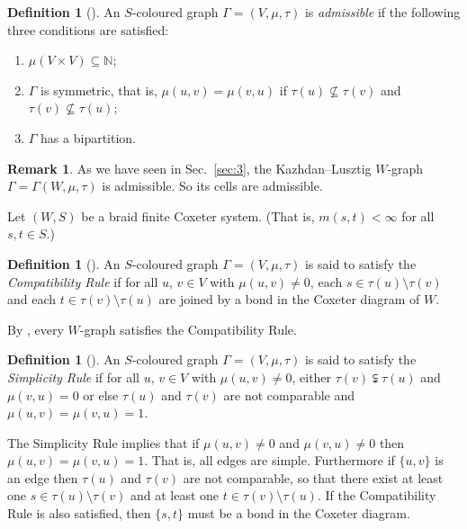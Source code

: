 \documentclass[10pt]{amsart}
\theoremstyle{definition}
\newtheorem{defi}[theo]{Definition}
\newtheorem{rema}[theo]{Remark}
\newcommand{\citex}[2]{\cite[#1]{#2}}
\begin{document}
\begin{defi}[{\cite[Definition~2.1]{stem:addwgraph}}]\label{admissibleWg}
An $S$-coloured graph $\Gamma = (V,\mu,\tau)$ is
\emph{admissible} if the following three conditions are satisfied:
\begin{enumerate}[label=(\roman*)]
\item $\mu(V\times V) \subseteq \mathbb{N}$;
\item $\Gamma$ is symmetric, that is, $\mu(u,v) = \mu(v,u)$ if $\tau(u) \nsubseteq \tau(v)$
and $\tau(v) \nsubseteq \tau(u)$;
\item $\Gamma$ has a bipartition.
\end{enumerate}
\end{defi}

\begin{rema}\label{KLgraphisadmissibl}
As we have seen in Sec.~\ref{sec:3}, the Kazhdan--Lusztig
$W\!$-graph $\Gamma=\Gamma(W,\mu,\tau)$ is admissible.
So its cells are admissible.
\end{rema}
Let $(W,S)$ be a braid finite Coxeter system. (That is, $m(s,t)<\infty$ for all
$s,t\in S$.)

\begin{defi}[{\citex{Definition~2.1}{stem:morewgraph}}]\label{compatibility}
An $S$-coloured graph $\Gamma = (V,\mu,\tau)$ is said to satisfy the
\emph{Compatibility Rule}
if for all $u,\,v\in V$ with $\mu(u,v)\ne 0$,
each $s \in \tau(u)\setminus \tau(v)$ and each $t\in\tau(v)\setminus\tau(u)$
are joined by a bond in the Coxeter diagram of $W$.
\end{defi}
By \cite[Proposition~4.1]{stem:addwgraph}, every $W\!$-graph satisfies the
Compatibility Rule.

\begin{defi}[{\citex{Definition~2.3}{stem:morewgraph}}]\label{simplicity}
An $S$-coloured graph $\Gamma = (V,\mu,\tau)$ is said to satisfy the
\emph{Simplicity Rule}
if for all $u,\,v\in V$ with $\mu(u,v) \neq 0$,
either $\tau(v) \subsetneqq \tau(u)$ and $\mu(v,u) = 0$ or else
$\tau(u)$ and $\tau(v)$ are not comparable and $\mu(u,v) = \mu(v,u) = 1$.
\end{defi}
The Simplicity Rule implies that if $\mu(u,v) \neq 0$ and $\mu(v,u) \neq 0$
then $\mu(u,v)=\mu(v,u)=1$. That is, all edges are simple. Furthermore if
$\{u,v\}$ is an edge then $\tau(u)$ and $\tau(v)$ are not comparable,
so that there exist at least one $s\in \tau(u)\setminus\tau(v)$ and
at least one $t\in \tau(v)\setminus\tau(u)$. If the Compatibility Rule is
also satisfied, then $\{s,t\}$ must be a bond in the Coxeter
diagram.
\end{document}
